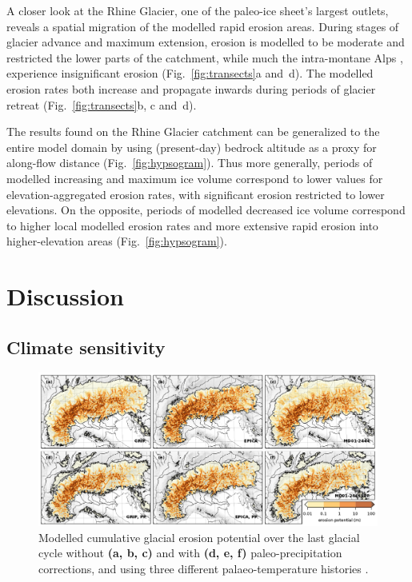 \documentclass[esurf, manuscript]{copernicus}
\begin{document}
    A closer look at the Rhine Glacier, one of the paleo-ice sheet's largest
    outlets, reveals a spatial migration of the modelled rapid erosion areas.
    During stages of glacier advance and maximum extension, erosion is modelled
    to be moderate and restricted the lower parts of the catchment, while much
    the intra-montane Alps \citep[modelled to be largely
    cold-based, Fig.~6c in][]{Seguinot.etal.2018}, experience
    insignificant erosion (Fig.~\ref{fig:transects}a and~d). The modelled
    erosion rates both increase and propagate inwards during periods of glacier
    retreat (Fig.~\ref{fig:transects}b, c and~d).

    The results found on the Rhine Glacier catchment can be generalized to the
    entire model domain by using (present-day) bedrock altitude as a proxy for
    along-flow distance (Fig.~\ref{fig:hypsogram}). Thus more generally,
    periods of modelled increasing and maximum ice volume correspond to lower
    values for elevation-aggregated erosion rates, with significant erosion
    restricted to lower elevations. On the opposite, periods of modelled
    decreased ice volume correspond to higher local modelled erosion rates and
    more extensive rapid erosion into higher-elevation areas
    (Fig.~\ref{fig:hypsogram}).


\section{Discussion}

\subsection{Climate sensitivity}
\label{sec:sensitivity}

    \begin{figure}[ht]
      \centerline{\includegraphics{alpero_sensitivity}}
      \caption{%
        Modelled cumulative glacial erosion potential over the last glacial
        cycle without \textbf{(a, b, c)} and with \textbf{(d, e, f)}
        paleo-precipitation corrections, and using three different
        palaeo-temperature histories \citep[see][]{Seguinot.etal.2018}.}
      \label{fig:sensitivity}
    \end{figure}
\end{document}
